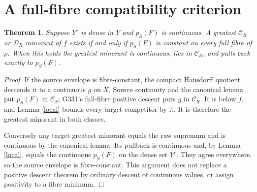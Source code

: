 \documentclass[11pt]{article}
\newtheorem{theorem}{Theorem}
\newcommand{\C}{\mathcal C}
\newcommand{\D}{\mathcal D}
\begin{document}
\section{A full-fibre compatibility criterion}
\begin{theorem}\label{criterion}
Suppose $Y^\circ$ is dense in $Y$ and $p_S(F)$ is continuous.
A greatest $\C_R$ or $\D_R$ minorant of $f$ exists if and only if
$p_S(F)$ is constant on every full fibre of $\rho$.
When this holds the greatest minorant is continuous, lies in $\C_R$,
and pulls back exactly to $p_S(F)$.
\end{theorem}
\begin{proof}
If the source envelope is fibre-constant, the compact Hausdorff quotient
descends it to a continuous $g$ on $X$. Source continuity and the canonical
lemma put $p_S(F)$ in $\C_S$; G331's full-fibre positive descent puts
$g$ in $\C_R$. It is below $f$, and Lemma \ref{local} bounds every target
competitor by it. It is therefore the greatest minorant in both classes.

Conversely any target greatest minorant equals the raw supremum and is
continuous by the canonical lemma. Its pullback is continuous and,
by Lemma \ref{local}, equals the continuous $p_S(F)$ on the dense set
$Y^\circ$. They agree everywhere, so the source envelope is fibre-constant.
This argument does not replace a positive descent theorem by ordinary
descent of continuous values, or assign positivity to a fibre minimum.
\end{proof}
\end{document}
